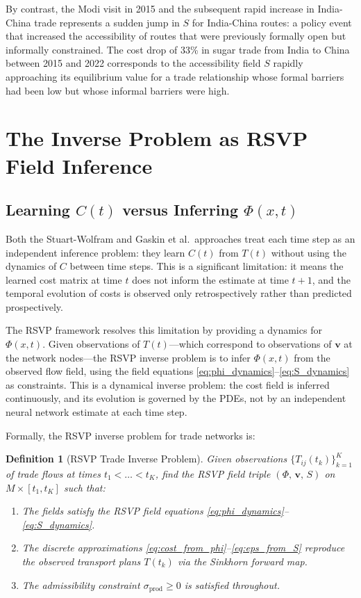 \documentclass[12pt]{article}
\newtheorem{definition}{Definition}[section]
\newcommand{\FieldTriple}{(\Phi,\,\mathbf{v},\,S)}
\newcommand{\sigprod}{\sigma_{\mathrm{prod}}}
\begin{document}
By contrast, the Modi visit in 2015 and the subsequent rapid increase in India-China trade represents a sudden jump in $S$ for India-China routes: a policy event that increased the accessibility of routes that were previously formally open but informally constrained. The cost drop of 33\% in sugar trade from India to China between 2015 and 2022 corresponds to the accessibility field $S$ rapidly approaching its equilibrium value for a trade relationship whose formal barriers had been low but whose informal barriers were high.

\section{The Inverse Problem as RSVP Field Inference}

\subsection{Learning $C(t)$ versus Inferring $\Phi(x,t)$}

Both the Stuart-Wolfram and Gaskin et al.\ approaches treat each time step as an independent inference problem: they learn $C(t)$ from $T(t)$ without using the dynamics of $C$ between time steps. This is a significant limitation: it means the learned cost matrix at time $t$ does not inform the estimate at time $t+1$, and the temporal evolution of costs is observed only retrospectively rather than predicted prospectively.

The RSVP framework resolves this limitation by providing a dynamics for $\Phi(x,t)$. Given observations of $T(t)$---which correspond to observations of $\mathbf{v}$ at the network nodes---the RSVP inverse problem is to infer $\Phi(x,t)$ from the observed flow field, using the field equations \eqref{eq:phi_dynamics}--\eqref{eq:S_dynamics} as constraints. This is a dynamical inverse problem: the cost field is inferred continuously, and its evolution is governed by the PDEs, not by an independent neural network estimate at each time step.

Formally, the RSVP inverse problem for trade networks is:

\begin{definition}[RSVP Trade Inverse Problem]
Given observations $\{T_{ij}(t_k)\}_{k=1}^K$ of trade flows at times $t_1 < \ldots < t_K$, find the RSVP field triple $\FieldTriple$ on $M \times [t_1, t_K]$ such that:
\begin{enumerate}[leftmargin=2em]
\item The fields satisfy the RSVP field equations \eqref{eq:phi_dynamics}--\eqref{eq:S_dynamics}.
\item The discrete approximations \eqref{eq:cost_from_phi}--\eqref{eq:eps_from_S} reproduce the observed transport plans $T(t_k)$ via the Sinkhorn forward map.
\item The admissibility constraint $\sigprod \geq 0$ is satisfied throughout.
\end{enumerate}
\end{definition}
\end{document}
